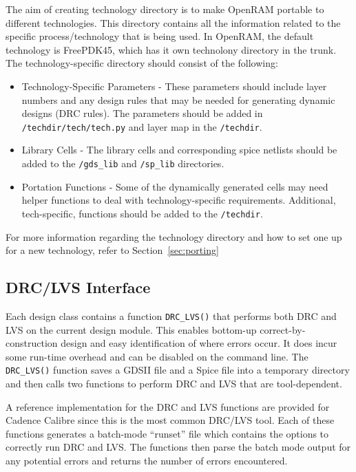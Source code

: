 The aim of creating technology directory is to make OpenRAM portable
to different technologies. This directory contains all the information
related to the specific process/technology that is being used.  In
OpenRAM, the default technology is FreePDK45, which has it own
technolony directory in the trunk.  The technology-specific directory
should consist of the following:
\begin{itemize}
\item Technology-Specific Parameters - These parameters should include
  layer numbers and any design rules that may be needed for generating
  dynamic designs (DRC rules). The parameters should be added in
  \verb|/techdir/tech/tech.py| and layer map in the \verb|/techdir|.
\item Library Cells - The library cells and corresponding spice
  netlists should be added to the \verb|/gds_lib| and \verb|/sp_lib|
  directories.
\item Portation Functions - Some of the dynamically generated cells
  may need helper functions to deal with technology-specific
  requirements.  Additional, tech-specific, functions should be added
  to the \verb|/techdir|.
\end{itemize}

For more information regarding the technology directory and how to set
one up for a new technology, refer to Section~\ref{sec:porting}

\subsection{DRC/LVS Interface}
\label{sec:drclvs}

Each design class contains a function \verb|DRC_LVS()| that performs both
DRC and LVS on the current design module. This enables bottom-up
correct-by-construction design and easy identification of where errors
occur. It does incur some run-time overhead and can be disabled on
the command line. The \verb|DRC_LVS()| function saves a GDSII file and a Spice
file into a temporary directory and then calls two functions to
perform DRC and LVS that are tool-dependent.

A reference implementation for the DRC and LVS functions are provided
for Cadence Calibre since this is the most common DRC/LVS tool. Each
of these functions generates a batch-mode ``runset'' file which
contains the options to correctly run DRC and LVS. The functions then
parse the batch mode output for any potential errors and returns the
number of errors encountered.

